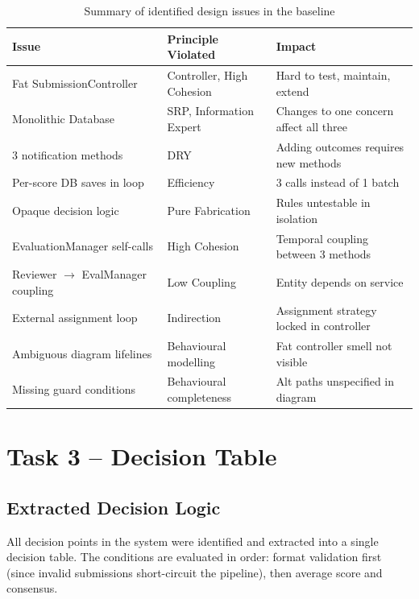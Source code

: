 \documentclass[12pt, a4paper]{article}
\begin{document}
\begin{table}[h]
\centering
\caption{Summary of identified design issues in the baseline}
\label{tab:design-issues}
\begin{tabularx}{\textwidth}{X l X}
    \toprule
    \textbf{Issue} & \textbf{Principle Violated} & \textbf{Impact} \\
    \midrule
    Fat SubmissionController & Controller, High Cohesion & Hard to test, maintain, extend \\
    Monolithic Database & SRP, Information Expert & Changes to one concern affect all three \\
    3 notification methods & DRY & Adding outcomes requires new methods \\
    Per-score DB saves in loop & Efficiency & 3 calls instead of 1 batch \\
    Opaque decision logic & Pure Fabrication & Rules untestable in isolation \\
    EvaluationManager self-calls & High Cohesion & Temporal coupling between 3 methods \\
    Reviewer $\rightarrow$ EvalManager coupling & Low Coupling & Entity depends on service \\
    External assignment loop & Indirection & Assignment strategy locked in controller \\
    Ambiguous diagram lifelines & Behavioural modelling & Fat controller smell not visible \\
    Missing guard conditions & Behavioural completeness & Alt paths unspecified in diagram \\
    \bottomrule
\end{tabularx}
\end{table}

\section{Task 3 -- Decision Table}
\label{sec:task3}

\subsection{Extracted Decision Logic}

All decision points in the system were identified and extracted into a single decision table. The conditions are evaluated in order: format validation first (since invalid submissions short-circuit the pipeline), then average score and consensus.
\end{document}
